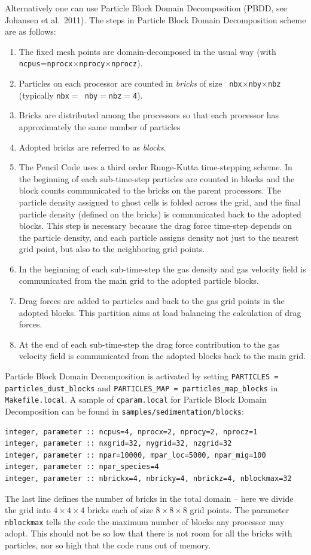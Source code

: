 \documentclass[\mydriver,12pt,twoside,notitlepage,a4paper]{article}
\newcommand{\code}[1]{\texttt{#1}}
\begin{document}
Alternatively one can use Particle Block Domain Decomposition (PBDD, see
Johansen et al.\ 2011). The steps in Particle Block Domain Decomposition scheme
are as follows:
\begin{enumerate}
  \item The fixed mesh points are domain-decomposed in the usual way (with
  \code{ncpus}=\code{nprocx}$\times$\code{nprocy}$\times$\code{nprocz}).
  \item Particles on each processor are counted in {\it bricks} of size \code{
  nbx}$\times$\code{nby}$\times$\code{nbz} (typically \code{nbx}$=$\code{
  nby}$=$\code{nbz}$=$\code{4}).
  \item Bricks are distributed among the processors so that each processor has
  approximately the same number of particles
  \item Adopted bricks are referred to as {\it blocks}.
  \item The Pencil Code uses a third order Runge-Kutta time-stepping scheme. In
  the beginning of each sub-time-step particles are counted in blocks and the
  block counts communicated to the bricks on the parent processors. The
  particle density assigned to ghost cells is folded across the grid, and the
  final particle density (defined on the bricks) is communicated back to the
  adopted blocks. This step is necessary because the drag force time-step
  depends on the particle density, and each particle assigns density not just
  to the nearest grid point, but also to the neighboring grid points.
  \item In the beginning of each sub-time-step the gas density and gas velocity
  field is communicated from the main grid to the adopted particle blocks.
  \item Drag forces are added to particles and back to the gas grid points in
  the adopted blocks. This partition aims at load balancing the calculation of
  drag forces.
  \item At the end of each sub-time-step the drag force contribution to the gas
  velocity field is communicated from the adopted blocks back to the main grid.
\end{enumerate}
Particle Block Domain Decomposition is activated by setting \code{PARTICLES =
particles_dust_blocks} and \code{PARTICLES_MAP = particles_map_blocks} in
\code{Makefile.local}. A sample of \code{cparam.local} for Particle Block
Domain Decomposition can be found in \code{samples/sedimentation/blocks}:
\begin{verbatim}
integer, parameter :: ncpus=4, nprocx=2, nprocy=2, nprocz=1
integer, parameter :: nxgrid=32, nygrid=32, nzgrid=32
integer, parameter :: npar=10000, mpar_loc=5000, npar_mig=100
integer, parameter :: npar_species=4
integer, parameter :: nbrickx=4, nbricky=4, nbrickz=4, nblockmax=32
\end{verbatim}
The last line defines the number of bricks in the total domain -- here we
divide the grid into $4\times4\times4$ bricks each of size $8\times8\times8$
grid points. The parameter \code{nblockmax} tells the code the maximum number
of blocks any processor may adopt. This should not be so low that there is not
room for all the bricks with particles, nor so high that the code runs out of
memory.
\end{document}
